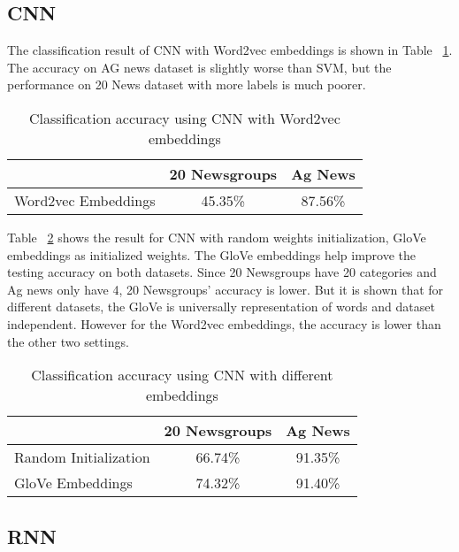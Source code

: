 \documentclass{article}
\begin{document}
\subsection{CNN}
The classification result of CNN with Word2vec embeddings is shown in Table ~\ref{Tab2}. The accuracy on AG news dataset is slightly worse than SVM, but the performance on 20 News dataset with more labels is much poorer.
\begin{table}[h!]
  \begin{center}
    \begin{tabular}{ l | c | c }
      \hline
       & 20 Newsgroups & Ag News  \\ \hline
      Word2vec Embeddings & 45.35\%  & 87.56\% \\ \hline
    \end{tabular}
    \caption{\small Classification accuracy using CNN with Word2vec embeddings}
    \label{Tab2}
  \end{center}
\end{table}

Table ~\ref{Tab3} shows the result for CNN with random weights initialization, GloVe embeddings as initialized weights. The GloVe embeddings help improve the testing accuracy on both datasets. Since 20 Newsgroups have 20 categories and Ag news only have 4, 20 Newsgroups’ accuracy is lower. But it is shown that for different datasets, the GloVe is universally representation of words and dataset independent. However for the Word2vec embeddings, the accuracy is lower than the other two settings.

\begin{table}[h!]
  \begin{center}
    \begin{tabular}{ l | c | c }
      \hline
       & 20 Newsgroups & Ag News  \\ \hline
      Random Initialization & 66.74\% &  91.35\%  \\ \hline
      GloVe Embeddings & 74.32\%  & 91.40\% \\ \hline
    \end{tabular}
    \caption{\small Classification accuracy using CNN with different embeddings}
    \label{Tab3}
  \end{center}
\end{table}

\subsection{RNN}
\end{document}
